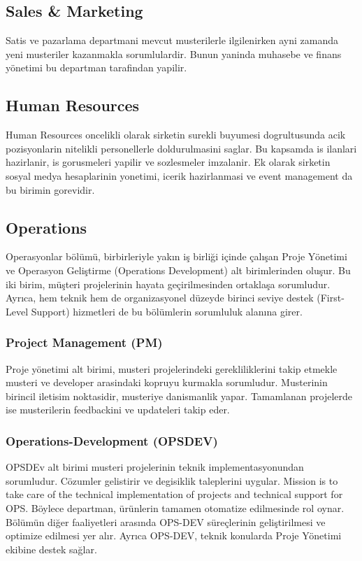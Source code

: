 \subsection{Sales \& Marketing}
Satis ve pazarlama departmani mevcut musterilerle ilgilenirken ayni zamanda yeni musteriler kazanmakla sorumlulardir. Bunun yaninda muhasebe ve finans yönetimi bu departman tarafindan yapilir.
\subsection{Human Resources}
Human Resources oncelikli olarak sirketin surekli buyumesi dogrultusunda acik pozisyonlarin nitelikli personellerle doldurulmasini saglar. Bu kapsamda is ilanlari hazirlanir, is gorusmeleri yapilir ve sozlesmeler imzalanir.
Ek olarak sirketin sosyal medya hesaplarinin yonetimi, icerik hazirlanmasi ve event management da bu birimin gorevidir.  
\subsection{Operations}
Operasyonlar bölümü, birbirleriyle yakın iş birliği içinde çalışan Proje Yönetimi ve Operasyon Geliştirme (Operations Development) alt birimlerinden oluşur. Bu iki birim, müşteri projelerinin hayata geçirilmesinden ortaklaşa sorumludur. Ayrıca, hem teknik hem de organizasyonel düzeyde birinci seviye destek (First-Level Support) hizmetleri de bu bölümlerin sorumluluk alanına girer.
\subsubsection{Project Management (PM)}
Proje yönetimi alt birimi, musteri projelerindeki gerekliliklerini takip etmekle musteri ve developer arasindaki kopruyu kurmakla sorumludur. 
Musterinin birincil iletisim noktasidir, musteriye danismanlik yapar. Tamamlanan projelerde ise musterilerin feedbackini ve updateleri takip eder.
\subsubsection{Operations-Development (OPSDEV)}
OPSDEv alt birimi musteri projelerinin teknik implementasyonundan sorumludur. Cözumler gelistirir ve degisiklik taleplerini uygular. 
Mission is to take care of the technical implementation of projects and technical support for OPS.
Böylece departman, ürünlerin tamamen otomatize edilmesinde rol oynar.
Bölümün diğer faaliyetleri arasında OPS-DEV süreçlerinin geliştirilmesi ve optimize edilmesi yer alır. Ayrıca OPS-DEV, teknik konularda Proje Yönetimi ekibine destek sağlar.
